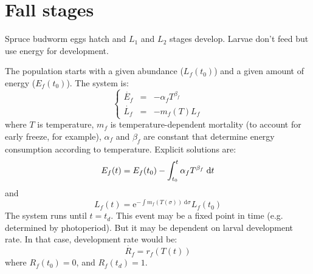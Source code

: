\documentclass[12 pt]{article}
\begin{document}
\section{Fall stages}
Spruce budworm eggs hatch and $L_1$ and $L_2$ stages develop. Larvae don't feed but use energy for development. \par
The population starts with a given abundance ($L_f(t_0)$) and a given amount of energy ($E_f(t_0)$).
The system is:
\begin{equation}
    \left \lbrace
    \begin{array}{lcl}
        \Dot{E_f} & = & - \alpha _f T^{\beta _f} \\
        \dot{L_f} & = & - m_f (T) L_f
    \end{array} \right .
\end{equation}
where $T$ is temperature, $m_f$ is temperature-dependent mortality (to account for early freeze, for example), $\alpha _f$ and $\beta _f$ are constant that determine energy consumption according to temperature. 
Explicit solutions are:
\begin{equation}
    E_f (t) = E_f (t_0) - \int _{t_0} ^t \alpha _f T^{\beta _f} \; \mathrm{d}t \\
\end{equation}
and
\begin{equation}
    L_f (t) = \mathrm{e}^{- \int m_f(T(\sigma)) \; \mathrm{d}\sigma}L_f (t_0)
\end{equation}
The system runs until $t=t_d$. This event may be a fixed point in time (e.g. determined by photoperiod). But it may be dependent on larval development rate. In that case, development rate would be:
\begin{equation}\label{development}
\Dot{R_f}=r_f(T(t))
\end{equation}
where $R_f(t_0)=0$, and $R_f(t_d)=1$. 
\end{document}
